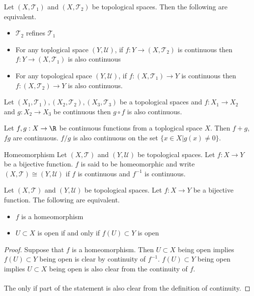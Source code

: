 \begin{prp}{}{} Let $(X,\mathcal{T}_1)$ and $(X,\mathcal{T}_2)$ be topological spaces. Then the following are equivalent. 
\begin{itemize}
\item $\mathcal{T}_2$ refines $\mathcal{T}_1$
\item For any toplogical space $(Y,\mathcal{U})$, if $f:Y\to (X,\mathcal{T}_2)$ is continuous then $f:Y\to (X,\mathcal{T}_1)$ is also continuous
\item For any topological space $(Y,\mathcal{U})$, if $f:(X,\mathcal{T}_1)\to Y$ is continuous then $f:(X,\mathcal{T}_2)\to Y$ is also continuous. 
\end{itemize}
\end{prp}

\begin{prp}{}{} Let $(X_1,\mathcal{T}_1),(X_2,\mathcal{T}_2),(X_3,\mathcal{T}_3)$ be a topological spaces and $f:X_1\to X_2$ and $g:X_2\to X_3$ be continuous then $g\circ f$ is also continuous. 
\end{prp}

\begin{prp}{}{} Let $f,g:X\to\R$ be continuous functions from a toplogical space $X$. Then $f+g$, $fg$ are continuous. $f/g$ is also continuous on the set $\{x\in X|g(x)\neq 0\}$. 
\end{prp}

\begin{defn}{Homeomorphism}{} Let $(X,\mathcal{T})$ and $(Y,\mathcal{U})$ be topological spaces. Let $f:X\to Y$ be a bijective function. $f$ is said to be homeomorphic and write $(X,\mathcal{T})\cong(Y,\mathcal{U})$ if $f$ is continuous and $f^{-1}$ is continuous. 
\end{defn}

\begin{prp}{}{} Let $(X,\mathcal{T})$ and $(Y,\mathcal{U})$ be topological spaces. Let $f:X\to Y$ be a bijective function. The following are equivalent. 
\begin{itemize}
\item $f$ is a homeomorphism
\item $U\subset X$ is open if and only if $f(U)\subset Y$ is open
\end{itemize} \tcbline
\begin{proof}
Suppose that $f$ is a homeomorphism. Then $U\subset X$ being open implies $f(U)\subset Y$ being open is clear by continuity of $f^{-1}$. $f(U)\subset Y$ being open implies $U\subset X$ being open is also clear from the continuity of $f$. \\~\\
The only if part of the statement is also clear from the definition of continuity. 
\end{proof}
\end{prp}

